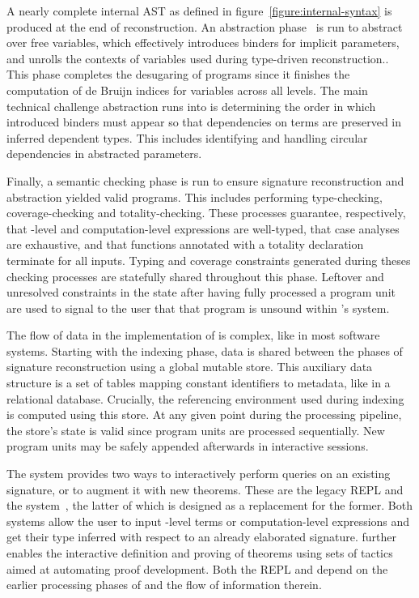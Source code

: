 A nearly complete internal \ac{AST} as defined in figure~\ref{figure:internal-syntax} is produced at the end of reconstruction.
An abstraction phase~\cite{germain2010implementation} is run to abstract over free variables, which effectively introduces binders for implicit parameters, and unrolls the contexts of variables used during type-driven reconstruction..
This phase completes the desugaring of \Beluga programs since it finishes the computation of de Bruijn indices for variables across all levels.
The main technical challenge abstraction runs into is determining the order in which introduced binders must appear so that dependencies on terms are preserved in inferred dependent types.
This includes identifying and handling circular dependencies in abstracted parameters.

Finally, a semantic checking phase is run to ensure signature reconstruction and abstraction yielded valid programs.
This includes performing type-checking, coverage-checking and totality-checking.
These processes guarantee, respectively, that \LF-level and computation-level expressions are well-typed, that case analyses are exhaustive, and that functions annotated with a totality declaration terminate for all inputs.
Typing and coverage constraints generated during theses checking processes are statefully shared throughout this phase.
Leftover and unresolved constraints in the state after having fully processed a program unit are used to signal to the user that that program is unsound within \Beluga's system.

The flow of data in the implementation of \Beluga is complex, like in most software systems.
Starting with the indexing phase, data is shared between the phases of signature reconstruction using a global mutable store.
This auxiliary data structure is a set of tables mapping constant identifiers to metadata, like in a relational database.
Crucially, the referencing environment used during indexing is computed using this store.
At any given point during the processing pipeline, the store's state is valid since program units are processed sequentially.
New program units may be safely appended afterwards in interactive sessions.

The \Beluga system provides two ways to interactively perform queries on an existing \Beluga signature, or to augment it with new theorems.
These are the legacy \ac{REPL} and the \Harpoon system~\cite{errington2021harpoon}, the latter of which is designed as a replacement for the former.
Both systems allow the user to input \LF-level terms or computation-level expressions and get their type inferred with respect to an already elaborated \Beluga signature.
\Harpoon further enables the interactive definition and proving of theorems using sets of tactics aimed at automating proof development.
Both the \ac{REPL} and \Harpoon depend on the earlier processing phases of \Beluga and the flow of information therein.

